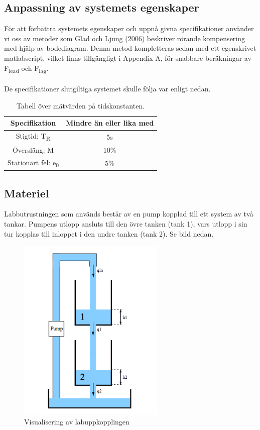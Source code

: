\documentclass{article}
\begin{document}
\subsection{Anpassning av systemets egenskaper}
För att förbättra systemets egenskaper och uppnå givna specifikationer använder vi oss av metoder som Glad och Ljung (2006) beskriver rörande kompensering med hjälp av bodediagram. Denna metod kompletteras sedan med ett egenskrivet matlabscript, vilket finns tillgängligt i Appendix A, för snabbare beräkningar av F\textsubscript{lead} och F\textsubscript{lag}. 
\\
\\
De specifikationer slutgiltiga systemet skulle följa var enligt nedan. 

\begin{table}[ht] 
\centering 
\begin{tabular}{c c} 
Specifikation & Mindre än eller lika med \\ [0.5ex] %
\hline
Stigtid: T\textsubscript{R} & 5s \\
Översläng: M & 10\% \\
Stationärt fel: e\textsubscript{0} & 5\% \\

\end{tabular} 
\caption{Tabell över mätvärden på tidskonstanten.}
\end{table}

\newpage




\subsection{Materiel}
Labbutrustningen som används består av en pump kopplad till ett system av två tankar. Pumpens utlopp ansluts till den övre tanken (tank 1), vars utlopp i sin tur kopplas till inloppet i den undre tanken (tank 2). Se bild nedan. 

\begin{figure}[ht!]
\centering
\includegraphics[width=70mm]{System.png}
\caption{Visualisering av labuppkopplingen}
\label{overflow}
\end{figure}
\end{document}

